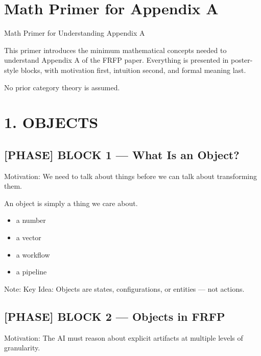 
\section*{Math Primer for Appendix A}

 Math Primer for Understanding Appendix A\par

This primer introduces the minimum mathematical concepts needed to understand Appendix A of the FRFP paper.
Everything is presented in poster-style blocks, with motivation first, intuition second, and formal meaning last.\par

No prior category theory is assumed.\par

\section*{1. OBJECTS}

\subsection*{[PHASE] BLOCK 1 --- What Is an Object?}

Motivation: We need to talk about things before we can talk about transforming them.\par

An object is simply a thing we care about.\par

\n\n\begin{itemize}\n\item a number
\item a vector
\item a workflow
\item a pipeline\n\end{itemize}

Note: Key Idea: Objects are states, configurations, or entities --- not actions.\par

\subsection*{[PHASE] BLOCK 2 --- Objects in FRFP}

Motivation: The AI must reason about explicit artifacts at multiple levels of granularity.\par

